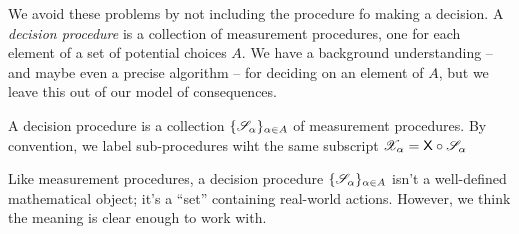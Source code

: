 We avoid these problems by not including the procedure fo making a decision. A \emph{decision procedure} is a collection of measurement procedures, one for each element of a set of potential choices $A$. We have a background understanding -- and maybe even a precise algorithm -- for deciding on an element of $A$, but we leave this out of our model of consequences. 

\begin{definition}
A decision procedure is a collection $\{\mathscr{S}_\alpha\}_{\alpha\in A}$ of measurement procedures. By convention, we label sub-procedures wiht the same subscript $\mathscr{X}_\alpha=\mathsf{X}\circ\mathscr{S}_\alpha$
\end{definition}

Like measurement procedures, a decision procedure $\{\mathscr{S}_\alpha\}_{\alpha\in A}$ isn't a well-defined mathematical object; it's a ``set'' containing real-world actions. However, we think the meaning is clear enough to work with.